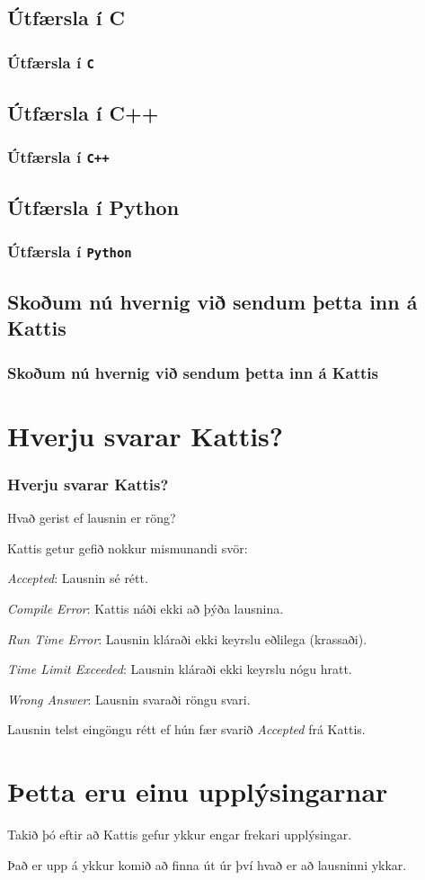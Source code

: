 \subsection{Útfærsla í C}
{
    \frametitle{Útfærsla í \texttt{C}}
}

\subsection{Útfærsla í C++}
{
    \frametitle{Útfærsla í \texttt{C++}}
}

\subsection{Útfærsla í Python}
{
    \frametitle{Útfærsla í \texttt{Python}}
}

\subsection{Skoðum nú hvernig við sendum þetta inn á Kattis}
{
    \frametitle{Skoðum nú hvernig við sendum þetta inn á Kattis}
}

\section{Hverju svarar Kattis?}
{
    \frametitle{Hverju svarar Kattis?}
    {
        \item<1-> Hvað gerist ef lausnin er röng?
        \item<2-> Kattis getur gefið nokkur mismunandi svör:
        \item<3-> \emph{Accepted}: Lausnin sé rétt.
        \item<4-> \emph{Compile Error}: Kattis náði ekki að þýða lausnina.
        \item<5-> \emph{Run Time Error}: Lausnin kláraði ekki keyrslu eðlilega (krassaði).
        \item<6-> \emph{Time Limit Exceeded}: Lausnin kláraði ekki keyrslu nógu hratt.
        \item<7-> \emph{Wrong Answer}: Lausnin svaraði röngu svari.
        \item<8-> Lausnin telst eingöngu rétt ef hún fær svarið \emph{Accepted} frá Kattis.
    }
}

\section{Þetta eru einu upplýsingarnar}
{
    {
        \item<1-> Takið þó eftir að Kattis gefur ykkur engar frekari upplýsingar.
        \item<2-> Það er upp á ykkur komið að finna út úr því hvað er að lausninni ykkar.
    }
}


